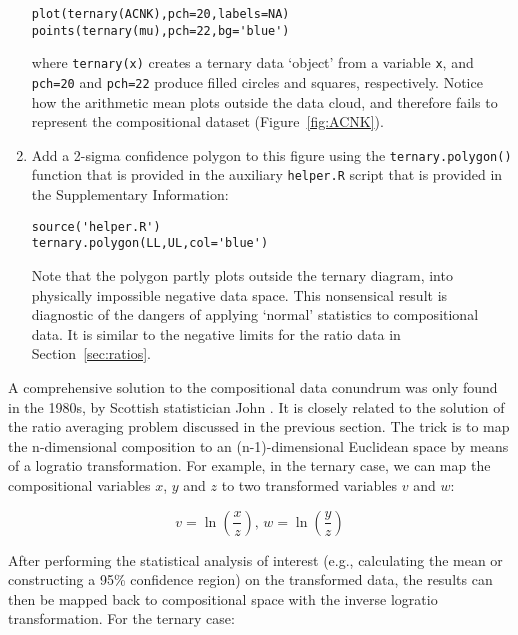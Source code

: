\documentclass[11pt]{article}
\begin{document}
\begin{enumerate}
\begin{verbatim}
plot(ternary(ACNK),pch=20,labels=NA)
points(ternary(mu),pch=22,bg='blue')
\end{verbatim}

\noindent where \texttt{ternary(x)} creates a ternary data `object'
from a variable \texttt{x}, and \texttt{pch=20} and \texttt{pch=22}
produce filled circles and squares, respectively. Notice how the
arithmetic mean plots outside the data cloud, and therefore fails to
represent the compositional dataset (Figure~\ref{fig:ACNK}).

\item\label{item:polygon} Add a 2-sigma confidence polygon to this
  figure using the \texttt{ternary.polygon()} function that is
  provided in the auxiliary \texttt{helper.R} script that is provided
  in the Supplementary Information:

\begin{verbatim}
source('helper.R')
ternary.polygon(LL,UL,col='blue')
\end{verbatim}

Note that the polygon partly plots outside the ternary diagram, into
physically impossible negative data space. This nonsensical result is
diagnostic of the dangers of applying `normal' statistics to
compositional data. It is similar to the negative limits for the ratio
data in Section~\ref{sec:ratios}.
\end{enumerate}

A comprehensive solution to the compositional data conundrum was only
found in the 1980s, by Scottish statistician John
\citet{aitchison1986}. It is closely related to the solution of the
ratio averaging problem discussed in the previous section. The trick
is to map the n-dimensional composition to an (n-1)-dimensional
Euclidean space by means of a logratio transformation. For example, in
the ternary case, we can map the compositional variables $x$, $y$ and
$z$ to two transformed variables $v$ and $w$:

\begin{equation}
  v = \ln\left(\frac{x}{z}\right) \mbox{,~} w =
  \ln\left(\frac{y}{z}\right)
  \label{eq:alr}
\end{equation}

After performing the statistical analysis of interest (e.g.,
calculating the mean or constructing a 95\% confidence region) on the
transformed data, the results can then be mapped back to compositional
space with the inverse logratio transformation. For the ternary case:
\end{document}
